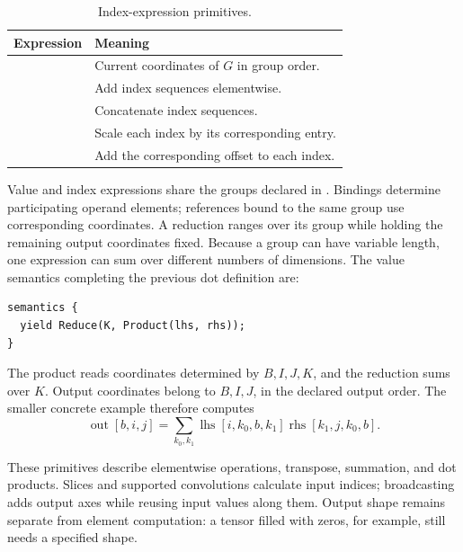 \begin{table}[htbp]
\caption{Index-expression primitives.}
\label{tab:index-expressions}
\begin{tabularx}{\linewidth}{@{}lY@{}}\toprule
Expression & Meaning\\\midrule
{} & Current coordinates of $G$ in group order.\\
 & Add index sequences elementwise.\\
 & Concatenate index sequences.\\
 & Scale each index by its corresponding entry.\\
 & Add the corresponding offset to each index.\\\bottomrule
\end{tabularx}
\end{table}

Value and index expressions share the groups declared in .
Bindings determine participating operand elements; references bound to the
same group use corresponding coordinates. A reduction ranges over its group
while holding the remaining output coordinates fixed. Because a group can
have variable length, one expression can sum over different numbers of
dimensions. The value semantics completing the previous dot definition are:
\begin{codeblock}[H]
\begin{lstlisting}[language=TEPL]
semantics {
  yield Reduce(K, Product(lhs, rhs));
}
\end{lstlisting}
\end{codeblock}
The product reads coordinates determined by $B,I,J,K$, and the reduction sums
over $K$. Output coordinates belong to $B,I,J$, in the declared output order.
The smaller concrete example therefore computes
\begin{equation}
 \operatorname{out}[b,i,j]
 =\sum_{k_0,k_1}\operatorname{lhs}[i,k_0,b,k_1]
                    \operatorname{rhs}[k_1,j,k_0,b].
\end{equation}

These primitives describe elementwise operations, transpose, summation,
and dot products. Slices and supported convolutions calculate input indices;
broadcasting adds output axes while reusing input values along them. Output
shape remains separate from element computation: a tensor filled with zeros,
for example, still needs a specified shape.

